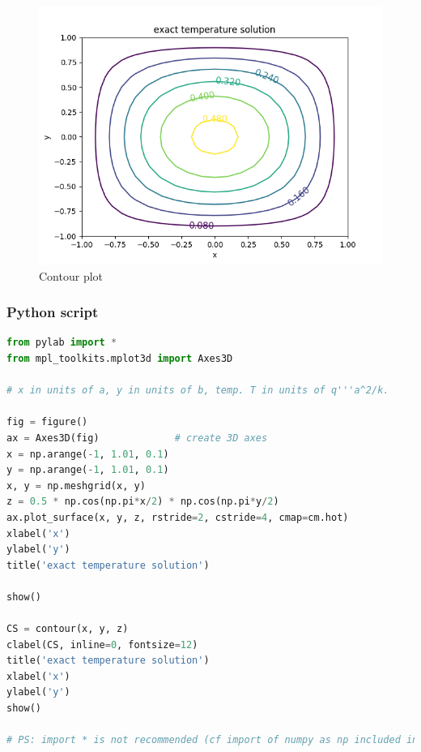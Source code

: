 \begin{figure}[H]
\centering
\includegraphics[scale=1]{fig/figure_2.png}
\caption{Contour plot}
\label{fig73}
\end{figure}





\newpage
\subsubsection{Python script}
\label{py3}
\begin{lstlisting}[language=python]
from pylab import *
from mpl_toolkits.mplot3d import Axes3D

# x in units of a, y in units of b, temp. T in units of q'''a^2/k.

fig = figure()
ax = Axes3D(fig)             # create 3D axes
x = np.arange(-1, 1.01, 0.1)
y = np.arange(-1, 1.01, 0.1)
x, y = np.meshgrid(x, y)
z = 0.5 * np.cos(np.pi*x/2) * np.cos(np.pi*y/2)
ax.plot_surface(x, y, z, rstride=2, cstride=4, cmap=cm.hot)
xlabel('x')
ylabel('y')
title('exact temperature solution')

show()

CS = contour(x, y, z)
clabel(CS, inline=0, fontsize=12)
title('exact temperature solution')
xlabel('x')
ylabel('y')
show()

# PS: import * is not recommended (cf import of numpy as np included in the background, confusing) I left it because it works.
\end{lstlisting}
\newpage
